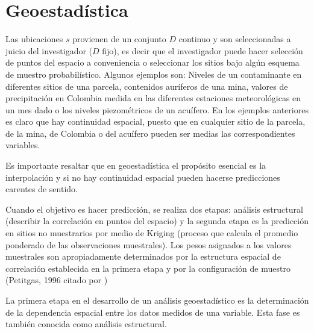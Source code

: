 
\section{Geoestadística}


Las ubicaciones $s$ provienen de un conjunto $D$ continuo  y son seleccionadas
a juicio del investigador ($D$ fijo), es decir que el investigador puede hacer selección de puntos del espacio a conveniencia o seleccionar los sitios bajo algún esquema de muestro probabilístico. Algunos ejemplos  son: Niveles de un contaminante en diferentes sitios de una
parcela, contenidos auríferos de una mina, valores de precipitación en Colombia medida en
las diferentes estaciones meteorológicas en un mes dado o los niveles piezométricos de un
acuífero. En los ejemplos anteriores es claro que hay continuidad espacial, puesto que en
cualquier sitio de la parcela, de la mina, de Colombia o del acuífero pueden ser medias las
correspondientes variables.

Es importante resaltar que en geoestadística el propósito esencial es la interpolación y si no hay continuidad espacial pueden hacerse predicciones carentes de sentido. \cite{giraldo}

Cuando el objetivo es hacer predicción, se realiza dos etapas: análisis estructural (describir la correlación en puntos del espacio) y la segunda etapa es la predicción en sitios no muestrarios por medio de Kriging (proceso que calcula el promedio ponderado de las observaciones muestrales). Los pesos asignados a los valores muestrales son apropiadamente determinados por la estructura espacial de correlación establecida en la primera etapa y por la configuración de muestro (Petitgas, 1996 citado por \cite{giraldo})

La primera etapa en el desarrollo de un análisis geoestadístico es la determinación de la dependencia espacial entre los datos medidos de una variable. Esta fase es también conocida como análisis estructural. \cite{giraldo}

